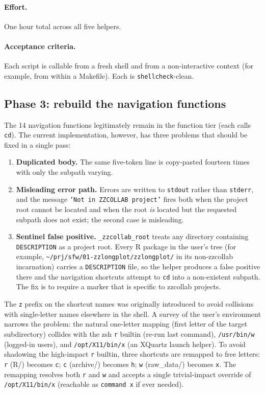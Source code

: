 \documentclass[11pt,letterpaper]{scrartcl}
\begin{document}
\paragraph{Effort.} One hour total across all five helpers.

\paragraph{Acceptance criteria.} Each script is callable from a
fresh shell and from a non-interactive context (for example, from
within a Makefile). Each is \texttt{shellcheck}-clean.

\subsection{Phase 3: rebuild the navigation functions}

The 14 navigation functions legitimately remain in the function
tier (each calls \texttt{cd}). The current implementation,
however, has three problems that should be fixed in a single
pass:

\begin{enumerate}
  \item \textbf{Duplicated body.} The same five-token line is
        copy-pasted fourteen times with only the subpath
        varying.
  \item \textbf{Misleading error path.} Errors are written to
        \texttt{stdout} rather than \texttt{stderr}, and the
        message \texttt{`Not in ZZCOLLAB project'} fires both
        when the project root cannot be located and when the
        root \emph{is} located but the requested subpath does
        not exist; the second case is misleading.
  \item \textbf{Sentinel false positive.}
        \texttt{\_zzcollab\_root} treats any directory containing
        \texttt{DESCRIPTION} as a project root. Every R package
        in the user's tree (for example,
        \texttt{\textasciitilde/prj/sfw/01-zzlongplot/zzlongplot/}
        in its non-zzcollab incarnation) carries a
        \texttt{DESCRIPTION} file, so the helper produces a false
        positive there and the navigation shortcuts attempt to
        \texttt{cd} into a non-existent subpath. The fix is to
        require a marker that is specific to zzcollab projects.
\end{enumerate}

The \texttt{z} prefix on the shortcut names was originally
introduced to avoid collisions with single-letter names elsewhere
in the shell. A survey of the user's environment narrows the
problem: the natural one-letter mapping (first letter of the
target subdirectory) collides with the zsh \texttt{r} builtin
(re-run last command), \texttt{/usr/bin/w} (logged-in users), and
\texttt{/opt/X11/bin/x} (an XQuartz launch helper). To avoid
shadowing the high-impact \texttt{r} builtin, three shortcuts
are remapped to free letters: \texttt{r} (R/) becomes
\texttt{c}; \texttt{c} (archive/) becomes \texttt{h}; \texttt{w}
(raw\_data/) becomes \texttt{x}. The remapping resolves both
\texttt{r} and \texttt{w} and accepts a single trivial-impact
override of \texttt{/opt/X11/bin/x} (reachable as \texttt{command
x} if ever needed).
\end{document}

